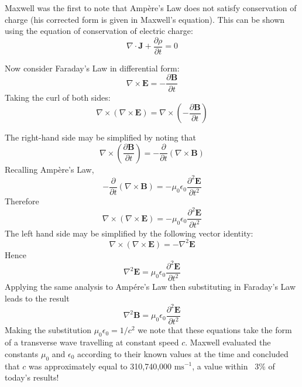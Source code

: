 \documentclass[12pt]{article}
\begin{document}
Maxwell was the first to note that Amp\`ere's Law does not satisfy conservation of charge (his corrected form is given in Maxwell's equation). This can be shown using the equation of conservation of electric charge:
\[
\nabla \cdot \mathbf{J} + \frac{\partial \rho}{\partial t} = 0
\]

Now consider Faraday's Law in differential form:
\[
\nabla \times \mathbf{E} = -\frac{ \partial \mathbf{B}}{\partial t}
\]
Taking the curl of both sides:
\[
\nabla \times (\nabla \times \mathbf{E}) =  \nabla \times (- \frac{ \partial \mathbf{B}}{\partial t})
\]

The right-hand side may be simplified by noting that
\[
\nabla \times (\frac{ \partial \mathbf{B}}{\partial t}) = - \frac{ \partial}{\partial t} (\nabla \times \mathbf{B})
\]
Recalling Amp\`ere's Law,
\[
- \frac{ \partial}{\partial t} (\nabla \times \mathbf{B}) = -\mu_0 \epsilon_0 \frac{ \partial^2 \mathbf{E}}{\partial t^2} 
\]
Therefore
\[
\nabla \times (\nabla \times \mathbf{E}) = -\mu_0 \epsilon_0 \frac{ \partial^2 \mathbf{E}}{\partial t^2} 
\]
The left hand side may be simplified by the following vector identity:
\[
\nabla \times (\nabla \times \mathbf{E}) = -\nabla^2 \mathbf{E}
\]
Hence
\[
\nabla^2 \mathbf{E} = \mu_0 \epsilon_0 \frac{ \partial^2 \mathbf{E}}{\partial t^2} 
\]
Applying the same analysis to Amp\'ere's Law then substituting in Faraday's Law leads to the result 
\[
\nabla^2 \mathbf{B} = \mu_0 \epsilon_0 \frac{ \partial^2 \mathbf{E}}{\partial t^2} 
\]
Making the substitution $\mu_0 \epsilon_0 = 1/c^2$ we note that these equations take the form of a transverse wave travelling at constant speed $c$. Maxwell evaluated the constants $\mu_0$ and $\epsilon_0$ according to their known values at the time and concluded that $c$ was approximately equal to 310,740,000 $\mbox{ms}^{-1}$, a value within ~3\% of today's results!
\end{document}

